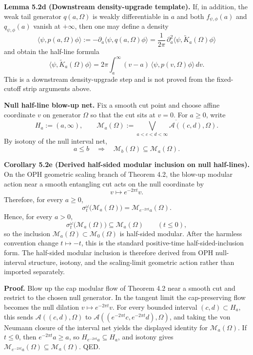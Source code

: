 \textbf{Lemma 5.2d (Downstream density-upgrade template).} If, in addition, the weak tail generator \(q(a,\Omega)\) is weakly differentiable in \(a\) and both \(f_{\psi,\phi}(a)\) and \(q_{\psi,\phi}(a)\) vanish at \(+\infty\), then one may define a density
\[
\langle\psi,p(a,\Omega)\phi\rangle
:=
-\partial_a\langle\psi,q(a,\Omega)\phi\rangle
=
\frac{1}{2\pi}\,\partial_a^2 \langle\psi,\widetilde K_a(\Omega)\phi\rangle
\]
and obtain the half-line formula
\[
\langle\psi,\widetilde K_a(\Omega)\phi\rangle
=
2\pi\int_a^\infty (v-a)\,\langle\psi,p(v,\Omega)\phi\rangle\,dv.
\]
This is a downstream density-upgrade step and is not proved from the fixed-cutoff strip arguments above.

\textbf{Null half-line blow-up net.} Fix a smooth cut point and choose affine coordinate \(v\) on generator \(\Omega\) so that the cut sits at \(v=0\). For \(a\ge 0\), write
\[
H_a:=(a,\infty),
\qquad
\mathcal M_a(\Omega)
:=
\overline{\bigvee_{a<c<d<\infty}\mathcal A((c,d),\Omega)}.
\]
By isotony of the null interval net,
\[
a\le b
\quad\Longrightarrow\quad
\mathcal M_b(\Omega)\subseteq \mathcal M_a(\Omega).
\]

\textbf{Corollary 5.2e (Derived half-sided modular inclusion on null half-lines).} On the OPH geometric scaling branch of Theorem 4.2, the blow-up modular action near a smooth entangling cut acts on the null coordinate by
\[
v\mapsto e^{-2\pi t}v.
\]
Therefore, for every \(a\ge 0\),
\[
\sigma_t^\omega\bigl(\mathcal M_a(\Omega)\bigr)
=
\mathcal M_{e^{-2\pi t}a}(\Omega).
\]
Hence, for every \(a>0\),
\[
\sigma_t^\omega\bigl(\mathcal M_a(\Omega)\bigr)\subseteq \mathcal M_a(\Omega)
\qquad (t\le 0),
\]
so the inclusion \(\mathcal M_a(\Omega)\subset \mathcal M_0(\Omega)\) is half-sided modular. After the harmless convention change \(t\mapsto -t\), this is the standard positive-time half-sided-inclusion form. The half-sided modular inclusion is therefore derived from OPH null-interval structure, isotony, and the scaling-limit geometric action rather than imported separately.

\textbf{Proof.} Blow up the cap modular flow of Theorem 4.2 near a smooth cut and restrict to the chosen null generator. In the tangent limit the cap-preserving flow becomes the null dilation \(v\mapsto e^{-2\pi t}v\). For every bounded interval \((c,d)\subset H_a\), this sends \(\mathcal A((c,d),\Omega)\) to \(\mathcal A((e^{-2\pi t}c,e^{-2\pi t}d),\Omega)\), and taking the von Neumann closure of the interval net yields the displayed identity for \(\mathcal M_a(\Omega)\). If \(t\le 0\), then \(e^{-2\pi t}a\ge a\), so \(H_{e^{-2\pi t}a}\subseteq H_a\), and isotony gives \(\mathcal M_{e^{-2\pi t}a}(\Omega)\subseteq \mathcal M_a(\Omega)\). QED.

